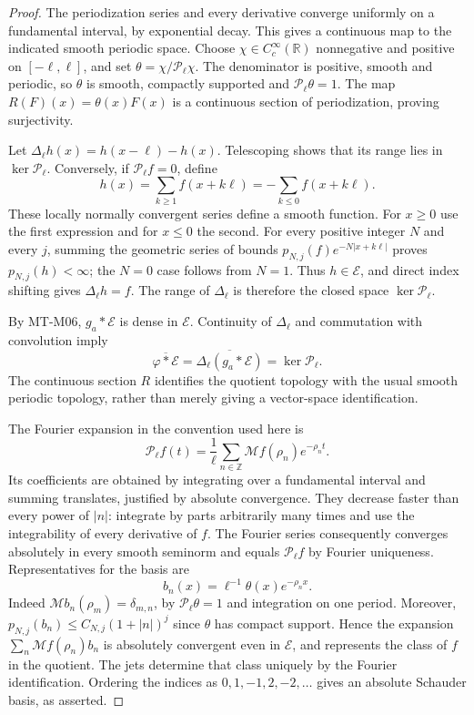 \documentclass[11pt,a4paper]{article}
\begin{document}
\begin{proof}
The periodization series and every derivative converge uniformly on a
fundamental interval, by exponential decay. This gives a continuous map
to the indicated smooth periodic space. Choose
$\chi\in C_c^\infty(\mathbb R)$ nonnegative and positive on
$[-\ell,\ell]$, and set
$\theta=\chi/\mathcal P_\ell\chi$. The denominator is positive,
smooth and periodic, so $\theta$ is smooth, compactly supported and
$\mathcal P_\ell\theta=1$. The map
$R(F)(x)=\theta(x)F(x)$ is a continuous section of periodization,
proving surjectivity.

Let $\Delta_\ell h(x)=h(x-\ell)-h(x)$. Telescoping shows that its
range lies in $\ker\mathcal P_\ell$. Conversely, if
$\mathcal P_\ell f=0$, define
\[
 h(x)=\sum_{k\ge1}f(x+k\ell)
     =-\sum_{k\le0}f(x+k\ell).
\]
These locally normally convergent series define a smooth function.
For $x\ge0$ use the first expression and for $x\le0$ the second.
For every positive integer $N$ and every $j$, summing the geometric
series of bounds $p_{N,j}(f)e^{-N|x+k\ell|}$ proves
$p_{N,j}(h)<\infty$; the $N=0$ case follows from $N=1$.
Thus $h\in\mathcal E$, and direct index shifting gives
$\Delta_\ell h=f$. The range of $\Delta_\ell$ is therefore the
closed space $\ker\mathcal P_\ell$.

By MT-M06, $g_a*\mathcal E$ is dense in $\mathcal E$.
Continuity of $\Delta_\ell$ and commutation with convolution imply
\[
 \overline{\varphi*\mathcal E}
 =\overline{\Delta_\ell(g_a*\mathcal E)}
 =\ker\mathcal P_\ell.
\]
The continuous section $R$ identifies the quotient topology with
the usual smooth periodic topology, rather than merely giving a
vector-space identification.

The Fourier expansion in the convention used here is
\[
 \mathcal P_\ell f(t)=\frac1\ell
       \sum_{n\in\mathbb Z}\mathcal Mf(\rho_n)e^{-\rho_n t}.
\]
Its coefficients are obtained by integrating over a fundamental
interval and summing translates, justified by absolute convergence.
They decrease faster than every power of $|n|$: integrate by parts
arbitrarily many times and use the integrability of every derivative
of $f$. The Fourier series consequently converges absolutely in
every smooth seminorm and equals $\mathcal P_\ell f$ by Fourier
uniqueness. Representatives for the basis are
\[
                     b_n(x)=\ell^{-1}\theta(x)e^{-\rho_n x}.
\]
Indeed $\mathcal Mb_n(\rho_m)=\delta_{m,n}$, by
$\mathcal P_\ell\theta=1$ and integration on one period. Moreover,
$p_{N,j}(b_n)\le C_{N,j}(1+|n|)^j$ since $\theta$ has compact
support. Hence the expansion
$\sum_n\mathcal Mf(\rho_n)b_n$ is absolutely convergent even in
$\mathcal E$, and represents the class of $f$ in the quotient.
The jets determine that class uniquely by the Fourier identification.
Ordering the indices as $0,1,-1,2,-2,\ldots$ gives an absolute
Schauder basis, as asserted.
\end{proof}
\end{document}
